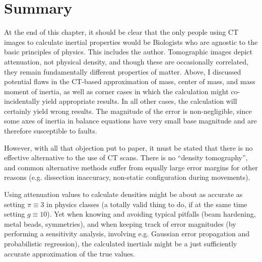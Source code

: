 \clearpage
\section{Summary}
\label{sec:org65e7851}
At the end of this chapter, it should be clear that the only people using CT images to calculate inertial properties would be Biologists who are agnostic to the basic principles of physics.
This includes the author.
Tomographic images depict attenuation, not physical density, and though these are occasionally correlated, they remain fundamentally different properties of matter.
Above, I discussed potential flaws in the CT-based approximation of mass, center of mass, and mass moment of inertia, as well as corner cases in which the calculation might co-incidentally yield appropriate results.
In all other cases, the calculation will certainly yield wrong results.
The magnitude of the error is non-negligible, since some axes of inertia in balance equations have very small base magnitude and are therefore susceptible to faults.


However, with all that objection put to paper, it must be stated that there is no effective alternative to the use of CT scans.
There is no ``density tomography'', and common alternative methods suffer from equally large error margins for other reasons (e.g. dissection inaccuracy, non-static configuration during movements).

Using attenuation values to calculate densities might be about as accurate as setting \(\pi \equiv 3\) in physics classes (a totally valid thing to do, if at the same time setting \(g \equiv 10\)).
Yet when knowing and avoiding typical pitfalls (beam hardening, metal beads, symmetries), and when keeping track of error magnitudes (by performing a sensitivity analysis, involving e.g. Gaussian error propagation and probabilistic regression), the calculated inertials might be a just sufficiently accurate approximation of the true values.
